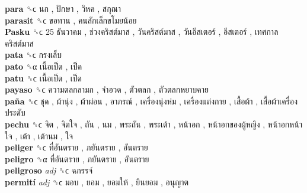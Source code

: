 \textbf{para} ␝ϲ   นก ,  ปักษา ,  วิหค ,  สกุณา   \\
\textbf{parasit} ␝ϲ   ขอทาน ,  คนลักเล็กขโมยน้อย   \\
\textbf{Pasku} ␝ϲ   25 ธันวาคม ,  ช่วงคริสต์มาส ,  วันคริสต์มาส ,  วันอีสเตอร์ ,  อีสเตอร์ ,  เทศกาลคริสต์มาส   \\
\textbf{pata} ␝ϲ   กรงเล็บ   \\
\textbf{pato} ␝α   เนื้อเป็ด ,  เป็ด   \\
\textbf{patu} ␝ϲ   เนื้อเป็ด ,  เป็ด   \\
\textbf{payaso} ␝ϲ   ความตลกลามก ,  จำอวด ,  ตัวตลก ,  ตัวตลกหยาบคาย   \\
\textbf{paña} ␝ϲ   ชุด ,  ผ้านุ่ง ,  ผ้าผ่อน ,  อาภรณ์ ,  เครื่องนุ่งห่ม ,  เครื่องแต่งกาย ,  เสื้อผ้า ,  เสื้อผ้าเครื่องประดับ   \\
\textbf{pechu} ␝ϲ   จิต ,  จิตใจ ,  ถัน ,  นม ,  พระถัน ,  พระเต้า ,  หน้าอก ,  หน้าอกของผู้หญิง ,  หน้าอกหน้าใจ ,  เต้า ,  เต้านม ,  ใจ   \\
\textbf{peliger} ␝ϲ   ที่อันตราย ,  ภยันตราย ,  อันตราย   \\
\textbf{peligro} ␝α   ที่อันตราย ,  ภยันตราย ,  อันตราย   \\
\textbf{peligroso} \emph{adj}  ␝ϲ   ฉกรรจ์   \\
\textbf{permití} \emph{adj}  ␝ϲ   มอบ ,  ยอม ,  ยอมให้ ,  ยินยอม ,  อนุญาต   \\
